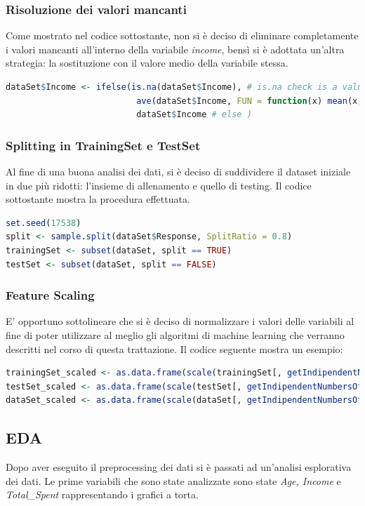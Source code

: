 \documentclass[letterpaper,11pt]{article}
\begin{document}
\subsubsection{Risoluzione dei valori mancanti}
Come mostrato nel codice sottostante, non si è deciso di eliminare completamente i valori mancanti all'interno della variabile \textit{income}, bensì si è adottata un'altra strategia: la sostituzione con il valore medio della variabile stessa.
\begin{lstlisting}[language=R]
dataSet$Income <- ifelse(is.na(dataSet$Income), # is.na check is a value is not available
                          ave(dataSet$Income, FUN = function(x) mean(x, na.rm = TRUE)), # if is not available change with average
                          dataSet$Income # else ) 
\end{lstlisting}
\subsubsection{Splitting in TrainingSet e TestSet}
Al fine di una buona analisi dei dati, si è deciso di suddividere il dataset iniziale in due più ridotti: l'insieme di allenamento e quello di testing. Il codice sottostante mostra la procedura effettuata.
\begin{lstlisting}[language=R]
set.seed(17538)
split <- sample.split(dataSet$Response, SplitRatio = 0.8)
trainingSet <- subset(dataSet, split == TRUE)
testSet <- subset(dataSet, split == FALSE)
\end{lstlisting}
\subsubsection{Feature Scaling}
E' opportuno sottolineare che si è deciso di normalizzare i valori delle variabili al fine di poter utilizzare al meglio gli algoritmi di machine learning che verranno descritti nel corso di questa trattazione. Il codice seguente mostra un esempio:
\begin{lstlisting}[language=R]
trainingSet_scaled <- as.data.frame(scale(trainingSet[, getIndipendentNumbersOfCol()]))
testSet_scaled <- as.data.frame(scale(testSet[, getIndipendentNumbersOfCol()]))
dataSet_scaled <- as.data.frame(scale(dataSet[, getIndipendentNumbersOfCol()]))
\end{lstlisting}

\subsection{EDA}
Dopo aver eseguito il preprocessing dei dati si è passati ad un'analisi esplorativa dei dati.
Le prime variabili che sono state analizzate sono state \textit{Age, Income} e \textit{Total\_Spent} rappresentando i grafici a torta.
\end{document}
